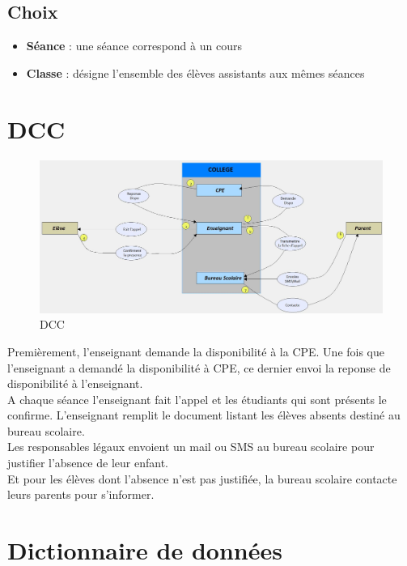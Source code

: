 \documentclass[12pt,french,titlepage]{article}
\begin{document}
	  \subsection{Choix}
	  
	  \begin{itemize}
	      \item \textbf{Séance} : une séance correspond à un cours
	      \item \textbf{Classe} : désigne l'ensemble des élèves assistants aux mêmes séances 
	  \end{itemize}
	  
	  \section{DCC}
	  
	  \begin{figure}[H]
	      \centering
	      \includegraphics[scale=0.35]{./DCC.jpg}
	      \caption{DCC}
	  \end{figure}
	  
	  Premièrement, l'enseignant demande la disponibilité à la CPE. Une fois que l'enseignant a demandé la disponibilité à CPE, ce dernier envoi la reponse de disponibilité à l'enseignant.\\
	  A chaque séance l'enseignant fait l'appel et les étudiants qui sont présents le confirme. L'enseignant remplit
	  le document listant les élèves absents destiné au bureau scolaire.\\
	  Les responsables légaux envoient un mail ou SMS au bureau scolaire pour justifier l'absence de leur enfant.\\
	  Et pour les élèves dont l'absence n'est pas justifiée, la bureau scolaire contacte leurs parents pour s'informer.\\
	  \section{Dictionnaire de données}
	  
\end{document}
